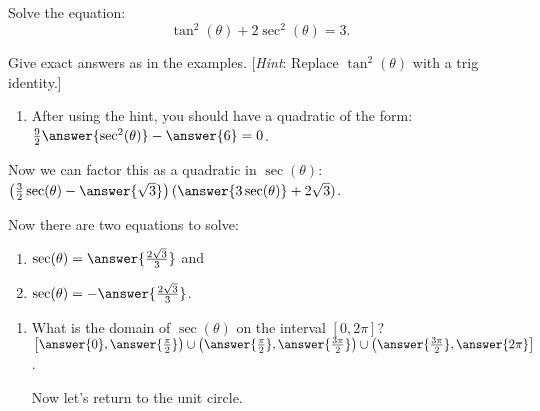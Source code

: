 \documentclass{ximera}
\author{Elizabeth Campolongo}
\begin{document}
\begin{exercise}
Solve the equation:
$$\tan^2(\theta) + 2\sec^2(\theta)=3.$$

Give exact answers as in the examples. [\textit{Hint}: Replace $\tan^2(\theta)$ with a trig identity.]

\begin{enumerate}
\item After using the hint, you should have a quadratic of the form: \smallskip\\

 $\frac{9}{2}\answer{\sec^2(\theta)} -\answer{6} = 0$.
 \end{enumerate}
\begin{exercise}
Now we can factor this as a quadratic in $\sec(\theta)$: \smallskip\\
$\left(\frac{3}{2}\sec(\theta) - \answer{\sqrt{3}}\right)(\answer{3\sec(\theta)} + 2\sqrt{3})$.

\begin{exercise}
Now there are two equations to solve:
\begin{enumerate}
\item $\sec(\theta) = \answer{\frac{2\sqrt{3}}{3}}$ and

\item $\sec(\theta) = -\answer{\frac{2\sqrt{3}}{3}}$.
\end{enumerate}

\begin{exercise}
\begin{enumerate}
\item What is the domain of $\sec(\theta)$ on the interval $[0, 2\pi]$?\smallskip \\
$\left[\answer{0},\answer{\frac{\pi}{2}}\right) \cup \left(\answer{\frac{\pi}{2}}, \answer{\frac{3\pi}{2}}\right) \cup \left(\answer{\frac{3\pi}{2}},\answer{2\pi}\right]$.


\bigskip
Now let's return to the unit circle. 
\begin{image}
\end{image}
\end{enumerate}
\end{exercise}
\end{exercise}
\end{exercise}
\end{exercise}
\end{document}
